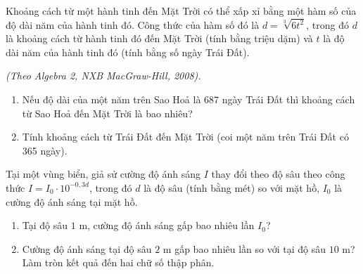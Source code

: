 \begin{baitap}%
	Khoảng cách từ một hành tinh đến Mặt Trời có thể xấp xỉ bằng một hàm số của độ dài năm của hành tinh đó. Công thức của hàm số đó là $d=\sqrt[3]{6 t^2}$, trong đó $d$ là khoảng cách từ hành tinh đó đến Mặt Trời (tính bằng triệu dặm) và $t$ là độ dài năm của hành tinh đó (tính bằng số ngày Trái Đất).\\
	\begin{flushright}
		\textit{(Theo Algebra 2, NXB MacGraw-Hill, 2008).}
	\end{flushright}
	\begin{enumerate}
		\item  Nếu độ dài của một năm trên Sao Hoả là 687 ngày Trái Đất thì khoảng cách từ Sao Hoả đến Mặt Trời là bao nhiêu?
		\item  Tính khoảng cách từ Trái Đất đến Mặt Trời (coi một năm trên Trái Đất có 365 ngày).
	\end{enumerate}
\end{baitap} 

\begin{baitap}
	Tại một vùng biển, giả sử cường độ ánh sáng $I$ thay đổi theo độ sâu theo công thức $I=I_0 \cdot 10^{-0,3d}$, trong đó $d$ là độ sâu (tính bằng mét) so với mặt hồ, $I_0$ là cường độ ánh sáng tại mặt hồ.
	\begin{enumerate}
		\item Tại độ sâu $1$ m, cường độ ánh sáng gấp bao nhiêu lần $I_0$?
		\item Cường độ ánh sáng tại độ sâu $2$ m gấp bao nhiêu lần so với tại độ sâu $10$ m? Làm tròn kết quả đến hai chữ số thập phân.
	\end{enumerate}
\end{baitap} 

